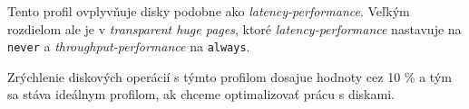 Tento profil ovplyvňuje disky podobne ako \emph{latency-performance}. Veľkým
rozdielom ale je v \emph{transparent huge pages}, ktoré
\emph{latency-performance} nastavuje na \texttt{never} a
\emph{throughput-performance} na \texttt{always}.

Zrýchlenie diskových operácií s týmto profilom dosajue hodnoty cez 10 \% a tým
sa stáva ideálnym profilom, ak chceme optimalizovať prácu s diskami.
